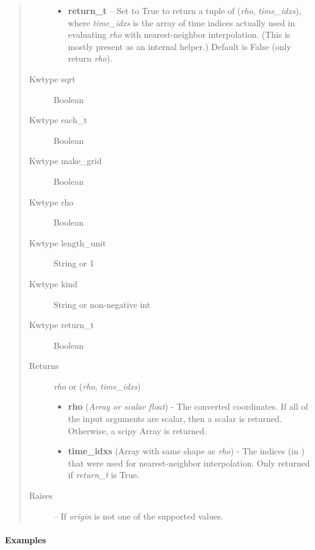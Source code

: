 \documentclass[letterpaper,10pt,english]{sphinxmanual}
\begin{document}
\begin{fulllineitems}
\begin{fulllineitems}
\begin{quote}
\begin{description}
\begin{itemize}
\item {} 
\textbf{return\_t} -- Set to True to return a tuple of (\emph{rho},
\emph{time\_idxs}), where \emph{time\_idxs} is the array of time indices
actually used in evaluating \emph{rho} with nearest-neighbor
interpolation. (This is mostly present as an internal helper.)
Default is False (only return \emph{rho}).

\end{itemize}

\item[{Kwtype sqrt}] \leavevmode
Boolean

\item[{Kwtype each\_t}] \leavevmode
Boolean

\item[{Kwtype make\_grid}] \leavevmode
Boolean

\item[{Kwtype rho}] \leavevmode
Boolean

\item[{Kwtype length\_unit}] \leavevmode
String or 1

\item[{Kwtype kind}] \leavevmode
String or non-negative int

\item[{Kwtype return\_t}] \leavevmode
Boolean

\item[{Returns}] \leavevmode

\emph{rho} or (\emph{rho}, \emph{time\_idxs})
\begin{itemize}
\item {} 
\textbf{rho} (\emph{Array or scalar float}) - The converted coordinates. If
all of the input arguments are scalar, then a scalar is returned.
Otherwise, a scipy Array is returned.

\item {} 
\textbf{time\_idxs} (Array with same shape as \emph{rho}) - The indices
(in ) that were used for
nearest-neighbor interpolation. Only returned if \emph{return\_t} is
True.

\end{itemize}


\item[{Raises}] \leavevmode
{} -- If \emph{origin} is not one of the supported values.

\end{description}\end{quote}
\paragraph{Examples}


\end{fulllineitems}
\end{fulllineitems}
\end{document}

